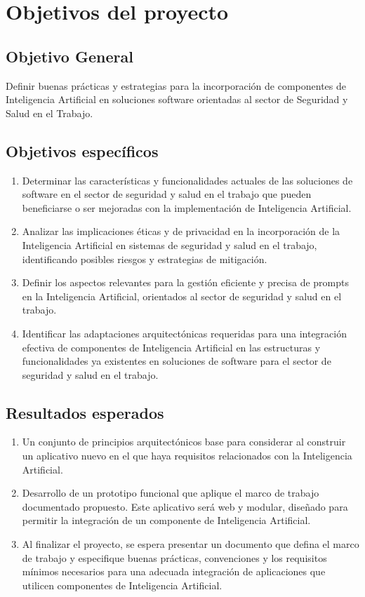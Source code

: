 \section{Objetivos del proyecto}
\subsection{Objetivo General}
Definir buenas prácticas y estrategias para la incorporación de componentes de Inteligencia Artificial en soluciones software orientadas al sector de Seguridad y Salud en el Trabajo. %

\subsection{Objetivos específicos}
\begin{enumerate}
    \item Determinar las características y funcionalidades actuales de las soluciones de software en el sector de seguridad y salud en el trabajo que pueden beneficiarse o ser mejoradas con la implementación de Inteligencia Artificial.
    \item Analizar las implicaciones éticas y de privacidad en la incorporación de la Inteligencia Artificial en sistemas de seguridad y salud en el trabajo, identificando posibles riesgos y estrategias de mitigación.
    \item Definir los aspectos relevantes para la gestión eficiente y precisa de prompts en la Inteligencia Artificial, orientados al sector de seguridad y salud en el trabajo.
    \item Identificar las adaptaciones arquitectónicas requeridas para una integración efectiva de componentes de Inteligencia Artificial en las estructuras y funcionalidades ya existentes en soluciones de software para el sector de seguridad y salud en el trabajo.
\end{enumerate}

\subsection{Resultados esperados}
\begin{enumerate}
    \item Un conjunto de principios arquitectónicos base para considerar al construir un aplicativo nuevo en el que haya requisitos relacionados con la Inteligencia Artificial.
    \item Desarrollo de un prototipo funcional que aplique el marco de trabajo documentado propuesto. Este aplicativo será web y modular, diseñado para permitir la integración de un componente de Inteligencia Artificial.
    \item Al finalizar el proyecto, se espera presentar un documento que defina el marco de trabajo y especifique buenas prácticas, convenciones y los requisitos mínimos necesarios para una adecuada integración de aplicaciones que utilicen componentes de Inteligencia Artificial.
\end{enumerate}